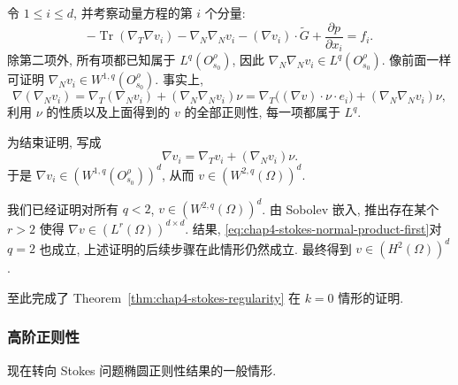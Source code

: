 令 $1\leq i\leq d$, 并考察动量方程的第 $i$ 个分量:
\[
 -\operatorname{Tr}(\nabla_T\nabla v_i)-\nabla_N\nabla_Nv_i
 -(\nabla v_i)\cdot\widetilde G+\frac{\partial p}{\partial x_i}=f_i.
\]
除第二项外, 所有项都已知属于 $L^q(O_{s_0}^\rho)$, 因此 $\nabla_N\nabla_Nv_i\in L^q(O_{s_0}^\rho)$. 像前面一样可证明 $\nabla_Nv_i\in W^{1,q}(O_{s_0}^\rho)$. 事实上,
\[
 \nabla(\nabla_Nv_i)=\nabla_T(\nabla_Nv_i)+(\nabla_N\nabla_Nv_i)\nu
 =\nabla_T\bigl((\nabla v)\cdot\nu\cdot e_i\bigr)+(\nabla_N\nabla_Nv_i)\nu,
\]
利用 $\nu$ 的性质以及上面得到的 $v$ 的全部正则性, 每一项都属于 $L^q$.

为结束证明, 写成
\[
 \nabla v_i=\nabla_Tv_i+(\nabla_Nv_i)\nu.
\]
于是 $\nabla v_i\in(W^{1,q}(O_{s_0}^\rho))^d$, 从而 $v\in(W^{2,q}(\Omega))^d$.

我们已经证明对所有 $q<2$, $v\in(W^{2,q}(\Omega))^d$. 由 Sobolev 嵌入, 推出存在某个 $r>2$ 使得 $\nabla v\in(L^r(\Omega))^{d\times d}$. 结果, 
\eqref{eq:chap4-stokes-normal-product-first}对 $q=2$ 也成立, 上述证明的后续步骤在此情形仍然成立. 最终得到 $v\in(H^2(\Omega))^d$.

至此完成了 Theorem~\ref{thm:chap4-stokes-regularity} 在 $k=0$ 情形的证明.

\subsubsection{高阶正则性}
\label{subsec:chap4-stokes-higher-regularity}

现在转向 Stokes 问题椭圆正则性结果的一般情形.


